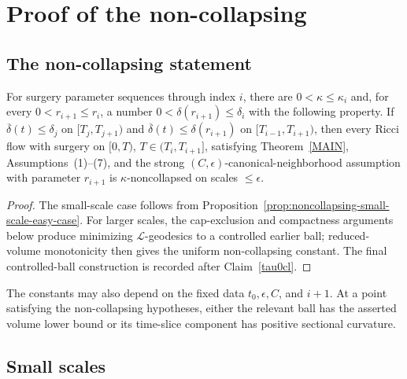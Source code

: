 \chapter{Proof of the non-collapsing}
\label{chap:proof-noncollapsing}
\label{sectnoncoll}

\section{The non-collapsing statement}

\begin{proposition}
\label{prop:kappa-limit-noncollapsing}
\label{KAPPALIMIT}
For surgery parameter sequences through index $i$, there are $0<\kappa\leq\kappa_i$ and, for every $0<r_{i+1}\leq r_i$, a number $0<\delta(r_{i+1})\leq\delta_i$ with the following property. If $\overline\delta(t)\leq\delta_j$ on $[T_j,T_{j+1})$ and $\overline\delta(t)\leq\delta(r_{i+1})$ on $[T_{i-1},T_{i+1})$, then every Ricci flow with surgery on $[0,T)$, $T\in(T_i,T_{i+1}]$, satisfying Theorem~\ref{MAIN}, Assumptions~(1)--(7), and the strong $(C,\epsilon)$-canonical-neighborhood assumption with parameter $r_{i+1}$ is $\kappa$-noncollapsed on scales $\leq\epsilon$.
\end{proposition}
\begin{proof}
\sketch
The small-scale case follows from Proposition~\ref{prop:noncollapsing-small-scale-easy-case}. For larger scales, the cap-exclusion and compactness arguments below produce minimizing $\mathcal L$-geodesics to a controlled earlier ball; reduced-volume monotonicity then gives the uniform non-collapsing constant. The final controlled-ball construction is recorded after Claim~\ref{tau0cl}.
\end{proof}

\begin{remark}
\label{rem:kappa-delta-dependence}

The constants may also depend on the fixed data $t_0,\epsilon,C$, and $i+1$. At a point satisfying the non-collapsing hypotheses, either the relevant ball has the asserted volume lower bound or its time-slice component has positive sectional curvature.
\end{remark}

\section{Small scales}
\label{rsmall}

